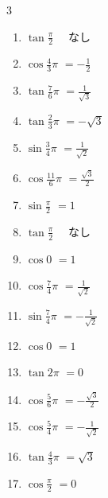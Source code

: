 \begin{multicols}{3}
\begin{enumerate}
  \item $\displaystyle \tan{\frac{\pi}{2}}$
        $\displaystyle \quad なし$

  \item $\displaystyle \cos{\frac{4}{3}\pi}$
        $\displaystyle =-\frac{1}{2}$

  \item $\displaystyle \tan{\frac{7}{6}\pi}$
        $\displaystyle =\frac{1}{\sqrt{3}}$

  \item $\displaystyle \tan{\frac{2}{3}\pi}$
        $\displaystyle =-\sqrt{3}$

  \item $\displaystyle \sin{\frac{3}{4}\pi}$
        $\displaystyle =\frac{1}{\sqrt{2}}$

  \item $\displaystyle \cos{\frac{11}{6}\pi}$
        $\displaystyle =\frac{\sqrt{3}}{2}$

  \item $\displaystyle \sin{\frac{\pi}{2}}$
        $\displaystyle =1$

  \item $\displaystyle \tan{\frac{\pi}{2}}$
        $\displaystyle \quad なし$

  \item $\displaystyle \cos{0}$
        $\displaystyle =1$

  \item $\displaystyle \cos{\frac{7}{4}\pi}$
        $\displaystyle =\frac{1}{\sqrt{2}}$

  \item $\displaystyle \sin{\frac{7}{4}\pi}$
        $\displaystyle =-\frac{1}{\sqrt{2}}$

  \item $\displaystyle \cos{0}$
        $\displaystyle =1$

  \item $\displaystyle \tan{2\pi}$
        $\displaystyle =0$

  \item $\displaystyle \cos{\frac{5}{6}\pi}$
        $\displaystyle =-\frac{\sqrt{3}}{2}$

  \item $\displaystyle \cos{\frac{5}{4}\pi}$
        $\displaystyle =-\frac{1}{\sqrt{2}}$

  \item $\displaystyle \tan{\frac{4}{3}\pi}$
        $\displaystyle =\sqrt{3}$

  \item $\displaystyle \cos{\frac{\pi}{2}}$
        $\displaystyle =0$


\end{enumerate}
\end{multicols}
